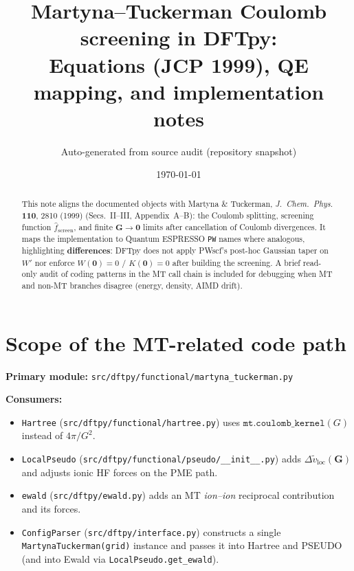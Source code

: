 \documentclass[11pt,a4paper]{article}
\title{Martyna--Tuckerman Coulomb screening in DFTpy:\\
Equations (JCP {1999}), QE mapping, and implementation notes}
\author{Auto-generated from source audit (repository snapshot)}
\date{\today}
\begin{document}
\maketitle

\begin{abstract}
This note aligns the documented objects with Martyna \& Tuckerman,
\emph{J.\ Chem.\ Phys.} \textbf{110}, 2810 (1999) (Secs.~II--III, Appendix~A--B):
the Coulomb splitting, screening function $\hat f_{\mathrm{screen}}$, and finite
$\mathbf G\to\mathbf 0$ limits after cancellation of Coulomb divergences. It maps the
implementation to Quantum ESPRESSO \texttt{PW} names where analogous, highlighting
\textbf{differences}: DFTpy does not apply PWscf's post-hoc Gaussian taper on $W'$ nor
enforce $W(\mathbf 0)=0$ / $K(\mathbf 0)=0$ after building the screening.
A brief read-only audit of coding patterns in the MT call chain is included for debugging
when MT and non-MT branches disagree (energy, density, AIMD drift).
\end{abstract}

\tableofcontents
\newpage

\section{Scope of the MT-related code path}

\noindent\textbf{Primary module:} \texttt{src/dftpy/functional/martyna\_tuckerman.py}

\noindent\textbf{Consumers:}
\begin{itemize}
  \item \texttt{Hartree} (\texttt{src/dftpy/functional/hartree.py}) uses
        $\texttt{mt.coulomb\_kernel}(G)$ instead of $4\pi/G^2$.
  \item \texttt{LocalPseudo} (\texttt{src/dftpy/functional/pseudo/\_\_init\_\_.py})
        adds $\Delta \tilde v_{\mathrm{loc}}(\mathbf G)$ and adjusts ionic HF forces
        on the PME path.
  \item \texttt{ewald} (\texttt{src/dftpy/ewald.py}) adds an MT \emph{ion--ion}
        reciprocal contribution and its forces.
  \item \texttt{ConfigParser} (\texttt{src/dftpy/interface.py}) constructs a single
        \texttt{MartynaTuckerman(grid)} instance and passes it into Hartree and PSEUDO
        (and into Ewald via \texttt{LocalPseudo.get\_ewald}).
\end{itemize}
\end{document}
